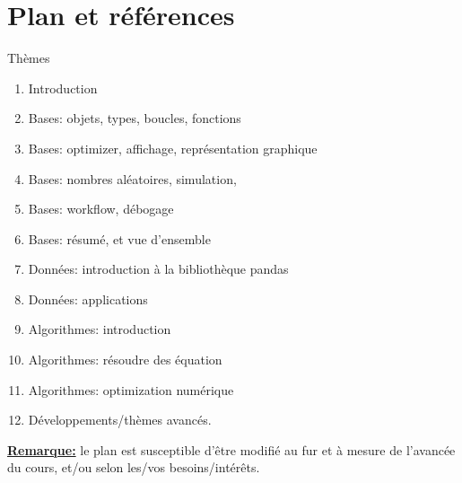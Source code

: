 \section{Plan et références}
\frame{\sectionpage}

\begin{frame}[allowframebreaks]{Thèmes}
\begin{enumerate}
    \item Introduction
    \item Bases: objets, types, boucles, fonctions
    \item Bases: optimizer, affichage, représentation graphique
    \item Bases: nombres aléatoires, simulation,
    \item Bases: workflow, débogage
    \item Bases: résumé, et vue d'ensemble
    \item Données: introduction à la bibliothèque pandas
    \item Données: applications 
    \item Algorithmes: introduction
    \item Algorithmes: résoudre des équation
    \item Algorithmes: optimization numérique
    \item Développements/thèmes avancés.
\end{enumerate}


\underline{\textbf{Remarque:}} le plan est susceptible d'être modifié au fur et à mesure 
de l'avancée du cours, et/ou selon les/vos besoins/intérêts.
\end{frame}

